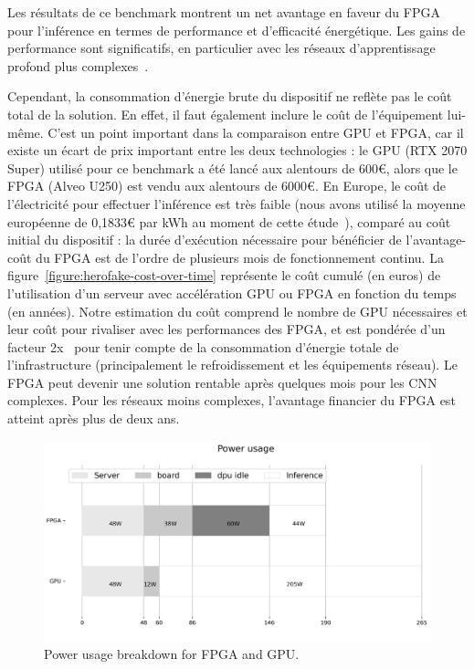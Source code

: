 Les résultats de ce benchmark montrent un net avantage en faveur du FPGA pour l'inférence en termes de performance et d'efficacité énergétique. Les gains de performance sont significatifs, en particulier avec les réseaux d'apprentissage profond plus complexes~\cite{8782524}. %

Cependant, la consommation d'énergie brute du dispositif ne reflète pas le coût total de la solution. En effet, il faut également inclure le coût de l'équipement lui-même. C'est un point important dans la comparaison entre GPU et FPGA, car il existe un écart de prix important entre les deux technologies : le GPU (RTX 2070 Super) utilisé pour ce benchmark a été lancé aux alentours de 600€, alors que le FPGA (Alveo U250) est vendu aux alentours de 6000€. En Europe, le coût de l'électricité pour effectuer l'inférence est très faible (nous avons utilisé la moyenne européenne de 0,1833€ par kWh au moment de cette étude~\cite{energy-price}), comparé au coût initial du dispositif : la durée d'exécution nécessaire pour bénéficier de l'avantage-coût du FPGA est de l'ordre de plusieurs mois de fonctionnement continu. La figure~\ref{figure:herofake-cost-over-time} représente le coût cumulé (en euros) de l'utilisation d'un serveur avec accélération GPU ou FPGA en fonction du temps (en années). Notre estimation du coût comprend le nombre de GPU nécessaires et leur coût pour rivaliser avec les performances des FPGA, et est pondérée d'un facteur 2x~\cite{shehabiUnitedStatesData2016} pour tenir compte de la consommation d'énergie totale de l'infrastructure (principalement le refroidissement et les équipements réseau). Le FPGA peut devenir une solution rentable après quelques mois pour les CNN complexes. Pour les réseaux moins complexes, l'avantage financier du FPGA est atteint après plus de deux ans.

\begin{figure}[t]
\centering
\includegraphics[width=\columnwidth]{4_Chapitre4/figures/characterization/power_usage.png}
\caption{Power usage breakdown for FPGA and GPU.}
\label{figure:herofake-power-usage}
\end{figure}

